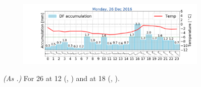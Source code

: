 \begin{figure}[ht!]
\begin{subfigure}[b]{0.49\textwidth}
		\includegraphics[trim={4.9cm 1.cm 1.5cm 1cm},clip,
		width=\textwidth]{./fig_weathermast/T_P_U_20161226}
		\caption{} \label{fig:TPU26}
	\end{subfigure}
\caption{\textit{(As .)} For \SI{26}{\dec} at \SI{12}{\UTC} (\protect{}, \protect{}) and at \SI{18}{\UTC} (\protect{}, \protect{}).}\label{fig:weather:26}
\end{figure}




